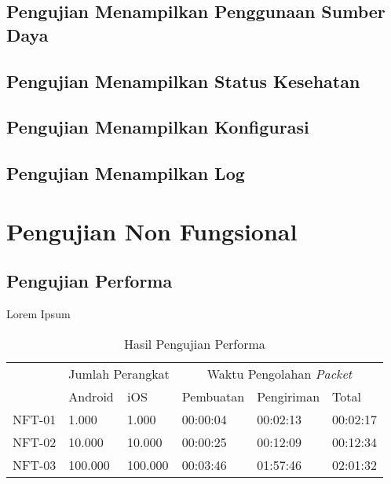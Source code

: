 \subsection{Pengujian Menampilkan Penggunaan Sumber Daya}

\subsection{Pengujian Menampilkan Status Kesehatan}

\subsection{Pengujian Menampilkan Konfigurasi}

\subsection{Pengujian Menampilkan Log}

\section{Pengujian Non Fungsional}

\subsection{Pengujian Performa}
\par Lorem Ipsum
\begin{longtable}{|p{1.3cm}|p{1.3cm}|p{1.3cm}|p{1.8cm}|p{1.8cm}|p{1.8cm}|}
	\caption{Hasil Pengujian Performa} \label{t:performa} \\ \hline
	\rowcolor{gray!10} & \multicolumn{2}{c|}{Jumlah Perangkat} & \multicolumn{3}{c|}{Waktu Pengolahan \textit{Packet}} \\ \hhline{~|*5{-}|}
	\rowcolor{gray!10} \multirow{-2}{*}{Kode} & Android & iOS & Pembuatan & Pengiriman & Total \\ \hline
	NFT-01 & 1.000 & 1.000 & 00:00:04 & 00:02:13 & 00:02:17 \\ \hline
	NFT-02 & 10.000 & 10.000 & 00:00:25 & 00:12:09 & 00:12:34 \\ \hline
	NFT-03 & 100.000 & 100.000 & 00:03:46 & 01:57:46 & 02:01:32 \\ \hline
\end{longtable}

